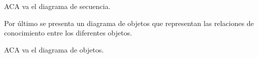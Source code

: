 % 
% 
% 
% 
% 
% 


ACA va el diagrama de secuencia.


Por \'ultimo se presenta un diagrama de objetos que representan las relaciones de conocimiento entre los diferentes objetos.

ACA va el diagrama de objetos.
